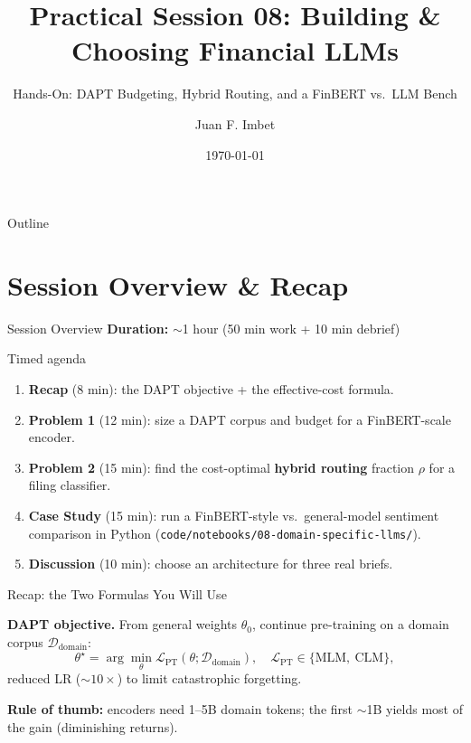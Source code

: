 \documentclass[9pt,t]{beamer}
\title{Practical Session 08: Building \& Choosing Financial LLMs}
\subtitle{Hands-On: DAPT Budgeting, Hybrid Routing, and a FinBERT vs.\ LLM Bench}
\author{Juan F. Imbet}
\institute{Paris Dauphine -- PSL University}
\date{\today}
\begin{document}
\begin{frame}\titlepage\end{frame}

\begin{frame}{Outline}\tableofcontents\end{frame}

\section{Session Overview \& Recap}

\begin{frame}{Session Overview}
\textbf{Duration:} $\sim$1 hour (50 min work + 10 min debrief)

\medskip
\begin{block}{Timed agenda}
\begin{enumerate}
  \item \textbf{Recap} (8 min): the DAPT objective + the effective-cost formula.
  \item \textbf{Problem 1} (12 min): size a DAPT corpus and budget for a FinBERT-scale
        encoder.
  \item \textbf{Problem 2} (15 min): find the cost-optimal \textbf{hybrid routing}
        fraction $\rho$ for a filing classifier.
  \item \textbf{Case Study} (15 min): run a FinBERT-style vs.\ general-model
        sentiment comparison in Python (\texttt{code/notebooks/08-domain-specific-llms/}).
  \item \textbf{Discussion} (10 min): choose an architecture for three real briefs.
\end{enumerate}
\end{block}
\end{frame}

\begin{frame}{Recap: the Two Formulas You Will Use}
\begin{underhood}
\textbf{DAPT objective.} From general weights $\theta_0$, continue pre-training on a
domain corpus $\mathcal{D}_{\text{domain}}$:
\[
  \theta^\star = \arg\min_\theta \mathcal{L}_{\text{PT}}(\theta;\mathcal{D}_{\text{domain}}),
  \quad \mathcal{L}_{\text{PT}} \in \{\text{MLM},\ \text{CLM}\},
\]
reduced LR ($\sim 10\times$) to limit catastrophic forgetting.
\end{underhood}

\medskip
\footnotesize \textbf{Rule of thumb:} encoders need 1--5B domain tokens; the first
$\sim$1B yields most of the gain (diminishing returns).
\end{frame}
\end{document}
